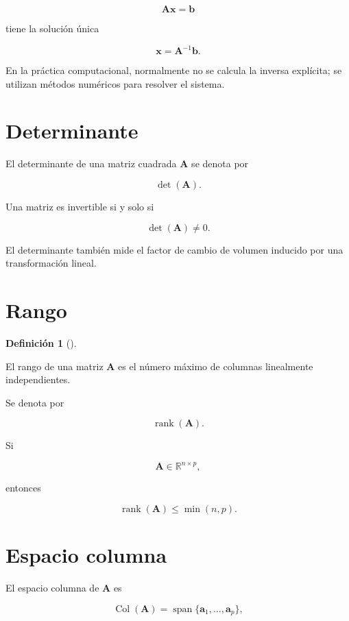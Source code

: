 \documentclass[
  spanish,
  11pt,
  letterpaper,
  DIV=11,
  numbers=noendperiod]{scrreprt}
\theoremstyle{definition}
\newtheorem{definition}{Definición}[chapter]
\theoremstyle{plain}
\theoremstyle{definition}
\theoremstyle{remark}
\begin{document}
\[
\mathbf{A}\mathbf{x}=\mathbf{b}
\]

tiene la solución única

\[
\mathbf{x}
=
\mathbf{A}^{-1}\mathbf{b}.
\]

En la práctica computacional, normalmente no se calcula la inversa
explícita; se utilizan métodos numéricos para resolver el sistema.

\section{Determinante}\label{determinante}

El determinante de una matriz cuadrada \(\mathbf{A}\) se denota por

\[
\det(\mathbf{A}).
\]

Una matriz es invertible si y solo si

\[
\det(\mathbf{A})\neq 0.
\]

El determinante también mide el factor de cambio de volumen inducido por
una transformación lineal.

\section{Rango}\label{rango}

\begin{definition}[]\protect\hypertarget{def-rango}{}\label{def-rango}

El rango de una matriz \(\mathbf{A}\) es el número máximo de columnas
linealmente independientes.

\end{definition}

Se denota por

\[
\operatorname{rank}(\mathbf{A}).
\]

Si

\[
\mathbf{A}\in\mathbb{R}^{n\times p},
\]

entonces

\[
\operatorname{rank}(\mathbf{A})
\leq
\min(n,p).
\]

\section{Espacio columna}\label{espacio-columna}

El espacio columna de \(\mathbf{A}\) es

\[
\operatorname{Col}(\mathbf{A})
=
\operatorname{span}
\{\mathbf{a}_1,\ldots,\mathbf{a}_p\},
\]
\end{document}
